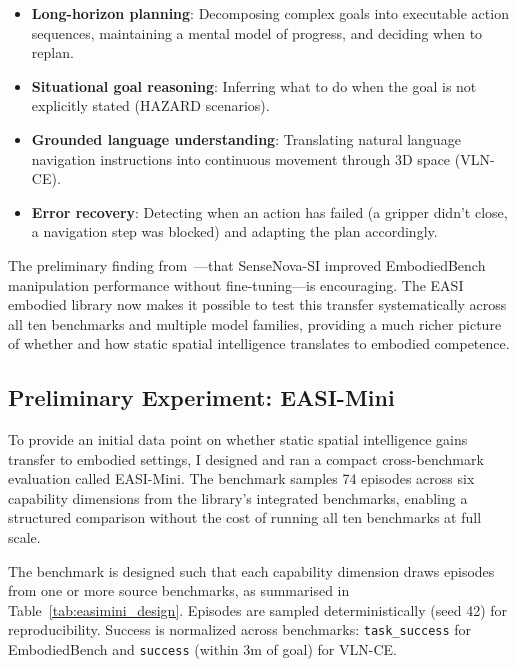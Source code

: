 \documentclass[
hf,
]{confart}
\begin{document}
\begin{itemize}
    \item \textbf{Long-horizon planning}: Decomposing complex goals into executable action sequences, maintaining a mental model of progress, and deciding when to replan.
    \item \textbf{Situational goal reasoning}: Inferring what to do when the goal is not explicitly stated (HAZARD scenarios).
    \item \textbf{Grounded language understanding}: Translating natural language navigation instructions into continuous movement through 3D space (VLN-CE).
    \item \textbf{Error recovery}: Detecting when an action has failed (a gripper didn't close, a navigation step was blocked) and adapting the plan accordingly.
\end{itemize}

The preliminary finding from~\cite{cai2025scalingspatialintelligencemultimodal}---that SenseNova-SI improved EmbodiedBench manipulation performance without fine-tuning---is encouraging. The EASI embodied library now makes it possible to test this transfer systematically across all ten benchmarks and multiple model families, providing a much richer picture of whether and how static spatial intelligence translates to embodied competence.

\subsection{Preliminary Experiment: EASI-Mini}

To provide an initial data point on whether static spatial intelligence gains transfer to embodied settings, I designed and ran a compact cross-benchmark evaluation called EASI-Mini. The benchmark samples 74 episodes across six capability dimensions from the library's integrated benchmarks, enabling a structured comparison without the cost of running all ten benchmarks at full scale.

The benchmark is designed such that each capability dimension draws episodes from one or more source benchmarks, as summarised in Table~\ref{tab:easimini_design}. Episodes are sampled deterministically (seed 42) for reproducibility. Success is normalized across benchmarks: \texttt{task\_success} for EmbodiedBench and \texttt{success} (within 3m of goal) for VLN-CE.
\end{document}

